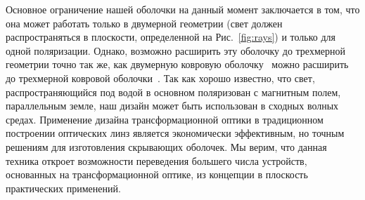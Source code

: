 \documentclass[a4paper, 12pt]{article}
\begin{document}
Основное ограничение нашей оболочки на данный момент заключается в том, что
она может работать только в двумерной геометрии (свет должен распространяться
в плоскости, определенной на Рис.~\ref{fig:rays}) и только для одной 
поляризации. Однако, возможно расширить эту оболочку до трехмерной геометрии
точно так же, как двумерную ковровую 
оболочку~\cite{li_carpet,valentine,gabrielli,park} можно расширить до
трехмерной ковровой оболочки~\cite{ergin,huifeng}. 
Так как хорошо известно, что свет,
распространяющийся под водой в основном поляризован с магнитным полем,
параллельным земле, наш дизайн может быть использован в сходных волных средах.
Применение дизайна трансформационной оптики в традиционном построении 
оптических линз является экономически эффективным, но точным решениям для
изготовления скрывающих оболочек. Мы верим, что данная техника откроет 
возможности переведения большего числа устройств, основанных на 
трансформационной оптике, из концепции в плоскость практических применений.
\end{document}
